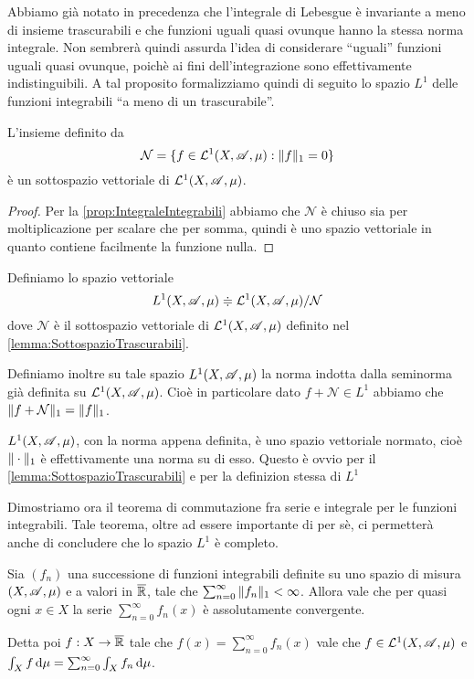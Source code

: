 Abbiamo già notato in precedenza che l'integrale di Lebesgue è invariante a meno di insieme trascurabili e che funzioni uguali quasi ovunque hanno la stessa norma integrale. Non sembrerà quindi assurda l'idea di considerare ``uguali'' funzioni uguali quasi ovunque, poichè ai fini dell'integrazione sono effettivamente indistinguibili. A tal proposito formalizziamo quindi di seguito lo spazio $L^1$ delle funzioni integrabili ``a meno di un trascurabile''.

\begin{lemma}\label{lemma:SottospazioTrascurabili}
	L'insieme definito da
	\begin{equation*}
		\mathcal{N}=\{ f\in\mathcal L^1(X,\mathscr A,\mu) : \Vert f\Vert_1=0\}
	\end{equation*}
	è un sottospazio vettoriale di $\mathcal L^1(X,\mathscr A,\mu)$.
\end{lemma}
\begin{proof}
	Per la \cref{prop:IntegraleIntegrabili} abbiamo che $\mathcal{N}$ è chiuso sia per moltiplicazione per scalare che per somma, quindi è uno spazio vettoriale in quanto contiene facilmente la funzione nulla.
\end{proof}

\begin{definition}
	Definiamo lo spazio vettoriale
	\begin{equation*}
		L^1(X,\mathscr A,\mu)\doteqdot \mathcal L^1(X,\mathscr A,\mu)/\mathcal{N}
	\end{equation*}
	dove $\mathcal{N}$ è il sottospazio vettoriale di $\mathcal L^1(X,\mathscr A,\mu)$ definito nel \cref{lemma:SottospazioTrascurabili}.
	
	Definiamo inoltre su tale spazio $L^1(X,\mathscr A,\mu)$ la norma indotta dalla seminorma già definita su $\mathcal L^1(X,\mathscr A,\mu)$. Cioè in particolare dato $f+\mathcal{N}\in L^1$ abbiamo che $\Vert f+\mathcal{N}\Vert_1=\Vert f\Vert_1$.
\end{definition}

\begin{remark}
	$L^1(X,\mathscr A,\mu)$, con la norma appena definita, è uno spazio vettoriale normato, cioè $\Vert \cdot\Vert_1$ è effettivamente una norma su di esso. Questo è ovvio per il \cref{lemma:SottospazioTrascurabili} e per la definizion stessa di $L^1$
\end{remark}

Dimostriamo ora il teorema di commutazione fra serie e integrale per le funzioni integrabili. Tale teorema, oltre ad essere importante di per sè, ci permetterà anche di concludere che lo spazio $L^1$ è completo.

\begin{theorem}\label{thm:IntegrazionePerSerie}
	Sia $(f_n)$ una successione di funzioni integrabili definite su uno spazio di misura $(X,\mathscr A,\mu)$ e a valori in $\overline{\mathbb R}$, tale che $\sum_{n=0}^{\infty}\Vert f_n\Vert_1<\infty$. Allora vale che per quasi ogni $x\in X$ la serie $\sum_{n=0}^\infty f_n(x)$ è assolutamente convergente. 
	
	Detta poi $f:X\to\overline{\mathbb R}$ tale che $f(x)=\sum_{n=0}^\infty f_n(x)$ vale che $f\in \mathcal L^1(X,\mathscr A,\mu)$ e $\int_X f\,\mathrm d\mu=\sum_{n=0}^\infty \int_X f_n\,\mathrm d\mu$.
\end{theorem}

